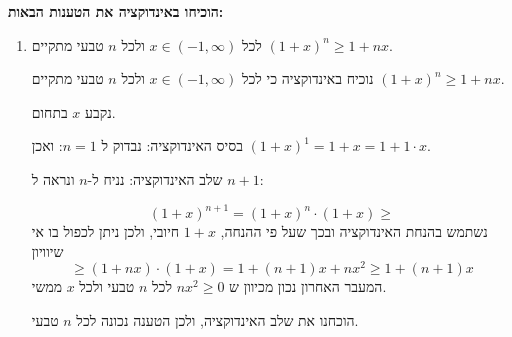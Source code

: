 \textbf{הוכיחו באינדוקציה את הטענות הבאות:}
\begin{enumerate}
\item
לכל
$x \in (-1, \infty)$
ולכל $n$ טבעי מתקיים
$(1 + x)^n \geq 1+nx$.
\begin{solbox}
נוכיח באינדוקציה כי לכל
$x \in (-1, \infty)$
ולכל $n$ טבעי מתקיים
$(1 + x)^n \geq 1+nx$.

נקבע $x$ בתחום.

בסיס האינדוקציה: נבדוק ל
$n=1$:
ואכן
$(1 + x)^1 = 1 + x  = 1+ 1 \cdot x$.

שלב האינדוקציה: נניח ל-$n$ ונראה ל
$n + 1$:

$$(1 + x)^{n + 1} = (1 + x)^n \cdot (1 + x)  \geq $$
נשתמש בהנחת האינדוקציה ובכך שעל פי ההנחה,
$1 + x$
חיובי, ולכן ניתן לכפול בו אי שיוויון
$$\geq (1+nx) \cdot (1 + x) = 1 + (n+1)x + nx^2 \geq 1 + (n+1)x$$
המעבר האחרון נכון מכיוון ש
$nx^2 \geq 0 $
לכל $n$ טבעי ולכל $x$ ממשי.

הוכחנו את שלב האינדוקציה, ולכן הטענה נכונה לכל $n$ טבעי.
\end{solbox}


\end{enumerate}

